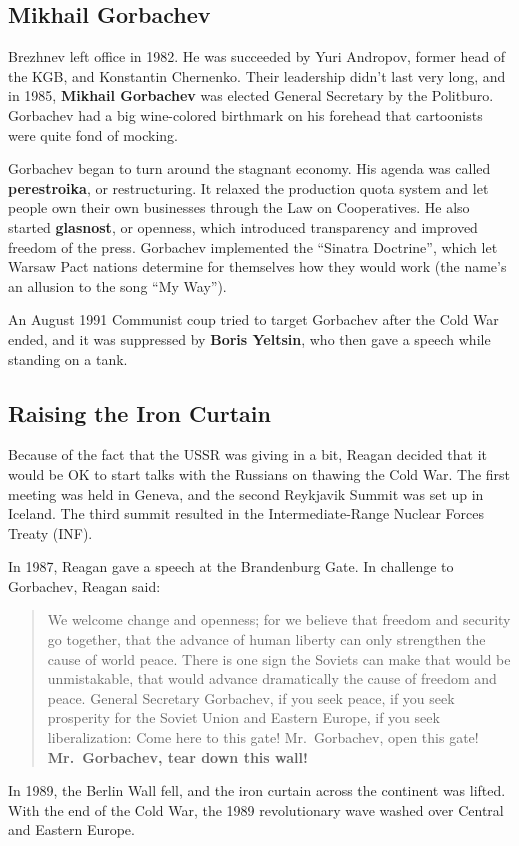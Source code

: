 \subsection*{Mikhail Gorbachev}

Brezhnev left office in 1982.
He was succeeded by Yuri Andropov, former head of the KGB, and Konstantin Chernenko.
Their leadership didn't last very long,
and in 1985, \textbf{Mikhail Gorbachev} was elected General Secretary by the Politburo.
Gorbachev had a big wine-colored birthmark on his forehead that cartoonists were quite fond of mocking.

Gorbachev began to turn around the stagnant economy.
His agenda was called \textbf{perestroika}, or restructuring.
It relaxed the production quota system and let people own their own businesses through the Law on Cooperatives.
He also started \textbf{glasnost}, or openness, which introduced transparency and improved freedom of the press.
Gorbachev implemented the ``Sinatra Doctrine'',
which let Warsaw Pact nations determine for themselves how they would work
(the name's an allusion to the song ``My Way'').

An August 1991 Communist coup tried to target Gorbachev after the Cold War ended,
and it was suppressed by \textbf{Boris Yeltsin}, who then gave a speech while standing on a tank.

\subsection*{Raising the Iron Curtain}

Because of the fact that the USSR was giving in a bit,
Reagan decided that it would be OK to start talks with the Russians on thawing the Cold War.
The first meeting was held in Geneva,
and the second Reykjavik Summit was set up in Iceland.
The third summit resulted in the Intermediate-Range Nuclear Forces Treaty (INF).

In 1987, Reagan gave a speech at the Brandenburg Gate.
In challenge to Gorbachev, Reagan said:
\begin{quote}
  We welcome change and openness; for we believe that freedom and security go together,
  that the advance of human liberty can only strengthen the cause of world peace.
  There is one sign the Soviets can make that would be unmistakable,
  that would advance dramatically the cause of freedom and peace.
  General Secretary Gorbachev, if you seek peace, if you seek prosperity for the Soviet Union and Eastern Europe,
  if you seek liberalization:
  Come here to this gate!
  Mr.\ Gorbachev, open this gate!
  \textbf{Mr.\ Gorbachev, tear down this wall!}
\end{quote}

In 1989, the Berlin Wall fell, and the iron curtain across the continent was lifted.
With the end of the Cold War, the 1989 revolutionary wave washed over Central and Eastern Europe.
